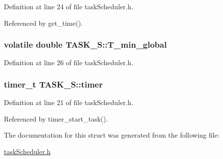 Definition at line 24 of file taskScheduler.h.



Referenced by get\_\-time().

\hypertarget{structTASK__S_a07174e333a0013f4d51b30509b388f58}{
\subsubsection[{T\_\-min\_\-global}]{\setlength{\rightskip}{0pt plus 5cm}volatile double {\bf TASK\_\-S::T\_\-min\_\-global}}}
\label{structTASK__S_a07174e333a0013f4d51b30509b388f58}


Definition at line 26 of file taskScheduler.h.

\hypertarget{structTASK__S_a17834f3d4f84241ccb4191f3cf7d7af3}{
\subsubsection[{timer}]{\setlength{\rightskip}{0pt plus 5cm}timer\_\-t {\bf TASK\_\-S::timer}}}
\label{structTASK__S_a17834f3d4f84241ccb4191f3cf7d7af3}


Definition at line 21 of file taskScheduler.h.



Referenced by timer\_\-start\_\-task().



The documentation for this struct was generated from the following file:\begin{DoxyCompactItemize}
\item 
\hyperlink{taskScheduler_8h}{taskScheduler.h}\end{DoxyCompactItemize}
